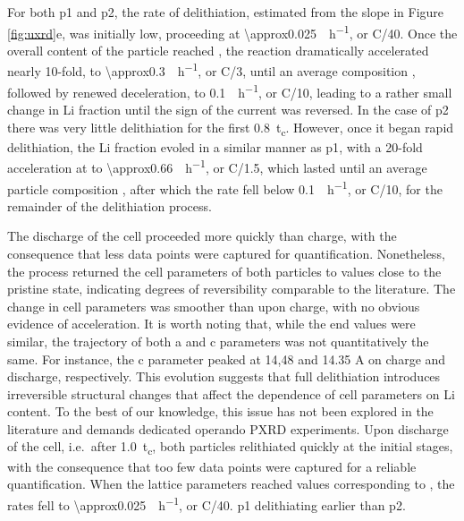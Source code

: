 \documentclass{article}
\begin{document}
For both \gls{p1} and \gls{p2}, the rate of delithiation, estimated
from the slope in Figure \ref{fig:uxrd}e, was initially low,
proceeding at \SI{\approx0.025}{\per\hour}, or C/40. Once the
overall content of the particle reached , the reaction
dramatically accelerated nearly 10-fold, to
\SI{\approx0.3}{\per\hour}, or C/3, until an average
composition , followed by renewed deceleration, to
\SI{0.1}{\per\hour}, or C/10, leading to a rather small change
in Li fraction until the sign of the current was reversed. In the case
of \gls{p2} there was very little delithiation for the first
\SI{0.8}{t_c}. However, once it began rapid delithiation, the Li
fraction evoled in a similar manner as \gls{p1}, with a 20-fold
acceleration at  to \SI{\approx0.66}{\per\hour}, or
C/1.5, which lasted until an average particle composition ,
after which the rate fell below \SI{0.1}{\per\hour}, or C/10,
for the remainder of the delithiation process.

The discharge of the cell proceeded more quickly than charge, with the consequence that less data points were captured for quantification. Nonetheless, the process returned the cell parameters of both particles to values close to the pristine state, indicating degrees of reversibility comparable to the literature.\cite{robert2015} The change in cell parameters was smoother than upon charge, with no obvious evidence of acceleration. It is worth noting that, while the end values were similar, the trajectory of both a and c parameters was not quantitatively the same. For instance, the c parameter peaked at 14,48 and 14.35 A on charge and discharge, respectively. This evolution suggests that full delithiation introduces irreversible structural changes that affect the dependence of cell parameters on Li content. To the best of our knowledge, this issue has not been explored in the literature and demands dedicated operando PXRD experiments. Upon discharge of the
cell, i.e.\ after \SI{1.0}{t_c}, both particles relithiated quickly at
the initial stages, with the consequence that too few data points were
captured for a reliable quantification. When the lattice parameters
reached values corresponding to , the rates fell to
\SI{\approx0.025}{\per\hour}, or C/40.  \gls{p1} delithiating earlier than \gls{p2}.
\end{document}
